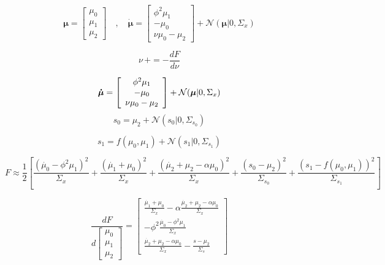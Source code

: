 \documentclass[a4paper, 10pt]{article}
\begin{document}
\begin{equation}
\bm \mu = \left[\begin{array}{c} \mu_0 \\ \mu_1 \\ \mu_2 \end{array}\right] 
	\quad , \quad \bm{\dot{\mu}} = \left[\begin{array}{c}
    \phi^2 \mu_1 \\
    -\mu_0 \\
    \nu \mu_0 - \mu_2
    \end{array}\right] + \mathcal{N}(\bm \mu | 0, \Sigma_x) 
\end{equation}

\begin{equation}
\nu \, += -\frac{dF}{d\nu}
\end{equation}

\begin{equation}
\bm{\dot{\mu}} = \left[\begin{array}{c}
    \phi^2 \mu_1 \\
    -\mu_0 \\
    \nu \mu_0 - \mu_2
    \end{array}\right] + \mathcal{N}(\bm \mu | 0, \Sigma_x)  \\
\end{equation}
\begin{equation}
s_0 = \mu_2 + \mathcal{N}(s_0 | 0, \Sigma_{s_0}) 
\end{equation}

\begin{equation}
s_1 = f(\mu_0, \mu_1) + \mathcal{N}(s_1 | 0, \Sigma_{s_1}) 
\end{equation}


\begin{equation}
F \approx \frac{1}{2} \left[ \frac{(\dot{\mu_0}-\phi^2\mu_1)^2}{\Sigma_x} + \frac{(\dot{\mu_1}+\mu_0)^2}{\Sigma_x} + \frac{(\dot{\mu_2}+\mu_2-\alpha\mu_0)^2}{\Sigma_x} + \frac{(s_0-\mu_2)^2}{\Sigma_{s_0}} + \frac{(s_1-f(\mu_0, \mu_1))^2}{\Sigma_{s_1}}\right]
\end{equation}

\begin{equation}
\frac{dF}{d \left[\begin{matrix}\mu_{0}\\\mu_{1}\\\mu_{2}\end{matrix}\right]} = \left[\begin{matrix}
	\frac{\dot{\mu_1}+\mu_0}{\Sigma_x} - \alpha\frac{\dot{\mu_2}+\mu_2-\alpha\mu_0}{\Sigma_x} \\
	-\phi^2\frac{\dot{\mu_0}-\phi^2\mu_1}{\Sigma_x}\\
	\frac{\dot{\mu_2}+\mu_2-\alpha\mu_0}{\Sigma_x} - \frac{s-\mu_2}{\Sigma_s}\end{matrix}\right]
\end{equation}
\end{document}
